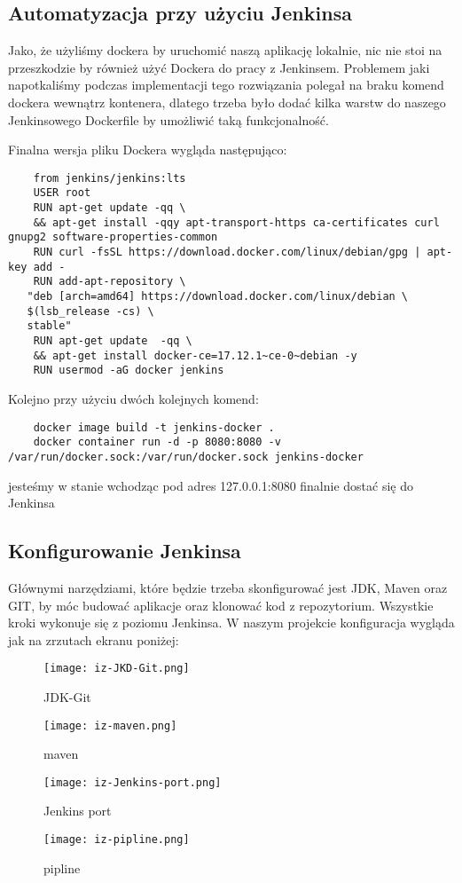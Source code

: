\subsection{Automatyzacja przy użyciu Jenkinsa}

Jako, że użyliśmy dockera by uruchomić naszą aplikację lokalnie, nic nie stoi na przeszkodzie by również użyć Dockera do pracy z Jenkinsem. Problemem jaki napotkaliśmy podczas implementacji tego rozwiązania polegał na braku komend dockera wewnątrz kontenera, dlatego trzeba było dodać kilka warstw do naszego Jenkinsowego Dockerfile by umożliwić taką funkcjonalność. 

Finalna wersja pliku Dockera wygląda następująco: 

\begin{lstlisting}
    from jenkins/jenkins:lts
    USER root
    RUN apt-get update -qq \
    && apt-get install -qqy apt-transport-https ca-certificates curl gnupg2 software-properties-common
    RUN curl -fsSL https://download.docker.com/linux/debian/gpg | apt-key add -
    RUN add-apt-repository \
   "deb [arch=amd64] https://download.docker.com/linux/debian \
   $(lsb_release -cs) \
   stable"
    RUN apt-get update  -qq \
    && apt-get install docker-ce=17.12.1~ce-0~debian -y
    RUN usermod -aG docker jenkins
\end{lstlisting}

Kolejno przy użyciu dwóch kolejnych komend:
\begin{lstlisting}
    docker image build -t jenkins-docker .
    docker container run -d -p 8080:8080 -v /var/run/docker.sock:/var/run/docker.sock jenkins-docker
\end{lstlisting}

jesteśmy w stanie wchodząc pod adres 127.0.0.1:8080 finalnie dostać się do Jenkinsa

\subsection{Konfigurowanie Jenkinsa}

Głównymi narzędziami, które będzie trzeba skonfigurować jest JDK, Maven oraz GIT, by móc budować aplikacje oraz klonować kod z repozytorium. Wszystkie kroki wykonuje się z poziomu Jenkinsa. W naszym projekcie konfiguracja wygląda jak na zrzutach ekranu poniżej:

\begin{figure}[htbp]
    \centering
    \texttt{[image: iz-JKD-Git.png]}
    \caption{JDK-Git}
    \label{fig:JDK-Git}
\end{figure}
\begin{figure}[htbp]
    \centering
    \texttt{[image: iz-maven.png]}
    \caption{maven}
    \label{fig:maven}
\end{figure}
\begin{figure}[htbp]
    \centering
    \texttt{[image: iz-Jenkins-port.png]}
    \caption{Jenkins port}
    \label{fig:Jenkins-port}
\end{figure}
\begin{figure}[htbp]
    \centering
    \texttt{[image: iz-pipline.png]}
    \caption{pipline}
    \label{fig:pipeline}
\end{figure}


